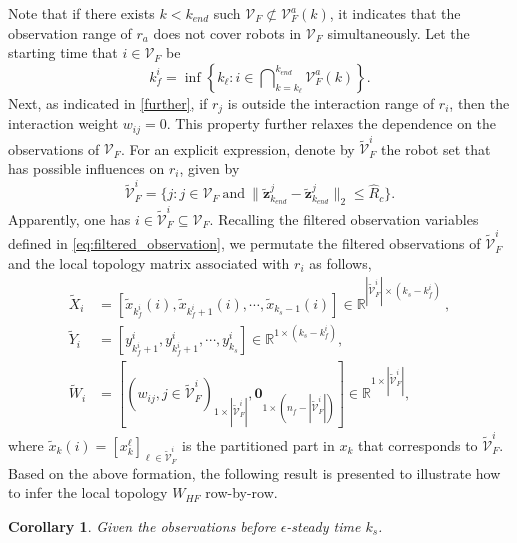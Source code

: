 \documentclass[12pt,journal,draftclsnofoot,onecolumn]{IEEEtran}
\newtheorem{corollary}{Corollary}
\let \sss=\scriptscriptstyle
\begin{document}
{{Note that if there exists $k< k_{end}$ such $\mathcal{V}_{\sss F}\not\subset\mathcal{V}_{\sss F}^{a}(k)$, it indicates that the observation range of $r_a$ does not cover robots in $\mathcal{V}_{\sss F}$ simultaneously. 
Let the starting time that $i\!\in\!\mathcal{V}_{\sss F}$ be
\begin{equation}
k_f^i=\inf\left\{ k_{\ell}: i\in \bigcap\nolimits_{k=k_{\ell}}^{k_{end}} \mathcal{V}_{\sss F}^{a}(k)  \right\}.
\end{equation}
Next, as indicated in \eqref{further}, if $r_j$ is outside the interaction range of $r_i$, then the interaction weight $w_{ij}=0$. 
This property further relaxes the dependence on the observations of $\mathcal{V}_{\sss F}$. 
For an explicit expression, denote by $\tilde{\mathcal{V}}_{\sss F}^{i}$ the robot set that has possible influences on $r_i$, given by 
\begin{equation}
\tilde{\mathcal{V}}_{\sss F}^{i}=\{j: j\in \mathcal{V}_{\sss F}~\text{and}~\|\tilde{\mathbf z}^j_{k_{end}}-\tilde{\mathbf z}^j_{k_{end} } \|_2 \le \hat R_c \}. 
\end{equation}
Apparently, one has $i\in\tilde{\mathcal{V}}_{\sss F}^{i}\subseteq\mathcal{V}_{\sss F}$. 
Recalling the filtered observation variables defined in \eqref{eq:filtered_observation}, 
we permutate the filtered observations of $\tilde{\mathcal{V}}_{\sss F}^{i}$ and the local topology matrix associated with $r_i$ as follows, 
\begin{align}
\tilde{X}_i&=[\tilde{x}_{k_f^i}(i),\tilde{x}_{k_f^i+1}(i),\cdots,\tilde{x}_{k_s-1}(i)] \in \mathbb{R}^{ |\tilde{\mathcal{V}}_{\sss F}^{i}| \times (k_s-k_f^i)}~, \nonumber \\
\tilde{Y}_i&=[{y}_{k_f^i+1}^i,{y}_{k_f^i+1}^i,\cdots,{y}_{k_s}^i] \in \mathbb{R}^{ 1 \times (k_s-k_f^i)}, \nonumber \\
\tilde{W}_{i}&= [ ({ w_{ij}, {j\in\tilde{\mathcal{V}}_{\sss F}^{i}}})_{1\times |\tilde{\mathcal{V}}_{\sss F}^{i}| } , \bm{0}_{1\times (n_f-|\tilde{\mathcal{V}}_{\sss F}^{i}|) } ] \in \mathbb{R}^{ 1 \times |\tilde{\mathcal{V}}_{\sss F}^{i}|}, \nonumber
\end{align}
where $\tilde{x}_k(i)=[x_k^{\ell}]_{\ell\in\tilde{\mathcal{V}}_{\sss F}^{i}}$ is the partitioned part in $x_k$ that corresponds to $\tilde{\mathcal{V}}_{\sss F}^{i}$. 
Based on the above formation, 
the following result is presented to illustrate how to infer the local topology ${W}_{\sss HF}$ row-by-row. 
\begin{corollary}\label{coro:extension}
Given the observations before $\epsilon$-steady time $k_s$. 

\end{corollary}}}
\end{document}
